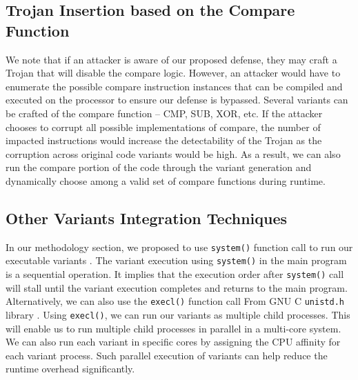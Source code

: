 \documentclass[conference]{IEEEtran}
\begin{document}
\subsection{Trojan Insertion based on the Compare Function}
We note that if an attacker is aware of our proposed defense, they may craft a Trojan that will disable the compare logic. However, an attacker would have to enumerate the possible compare instruction instances that can be compiled and executed on the processor to ensure our defense is bypassed.  Several variants can be crafted of the compare function -- CMP, SUB, XOR, etc. If the attacker chooses to corrupt all possible implementations of compare, the number of impacted instructions would increase the detectability of the Trojan as the corruption across original code variants would be high. As a result, we can also run the compare portion of the code through the variant generation and dynamically choose among a valid set of compare functions during runtime.

\subsection{Other Variants Integration Techniques}

In our methodology section, we proposed to use \texttt{system()} function call to run our executable variants \cite{syscall}. The variant execution using \texttt{system()} in the main program is a sequential operation. It implies that the execution order after \texttt{system()} call will stall until the variant execution completes and returns to the main program. Alternatively, we can also use the \texttt{execl()} function call From GNU C \texttt{unistd.h} library \cite{execl}. 
Using \texttt{execl()}, we can run our variants as multiple child processes.
This will enable us to run multiple child processes in parallel in a multi-core system. We can also run each variant in specific cores by assigning the CPU affinity for each variant process. Such parallel execution of variants can help reduce the runtime overhead significantly. 


\end{document}
